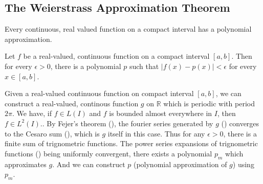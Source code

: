 \subsection{The Weierstrass Approximation Theorem}
	Every continuous, real valued function on a compact interval has a polynomial approximation.\cite[Theorem 11.17]{apostol}

\begin{theorem}[Weierstrass]
	Let $f$ be a real-valued, continuous function on a compact interval $[a,b]$. Then for every \(\epsilon > 0\), there is a polynomial $p$ such that \(|f(x)-p(x)| < \epsilon\) for every \(x \in [a,b]\).
\end{theorem}
\begin{synopsis}
	Given a real-valued continuous function on compact interval $[a,b]$, we can construct a real-valued, continous function $g$ on $\mathbb{R}$ which is periodic with period $2\pi$.
	We have, if \(f \in L(I)\) and $f$ is bounded almost everywhere in $I$, then \(f \in L^2(I)\).\cite[Theorem 10.52]{apostol}.
	By Fejer's theorem (\cite[Theorem 11.15]{apostol}), the fourier series generated by $g$ (\cite[definition 11.3]{apostol}) converges to the Cesaro sum (\cite[Definition 8.47]{apostol}), which is $g$ itself in this case.
	Thus for any \(\epsilon > 0\), there is a finite sum of trignometric functions.
	The power series expansions of trignometric functions (\cite[definition 9.27]{apostol}) being uniformly convergent, there exists a polynomial $p_m$ which approximates $g$.
	And we can construct $p$ (polynomial approximation of $g$) using $p_m$.
\end{synopsis}
